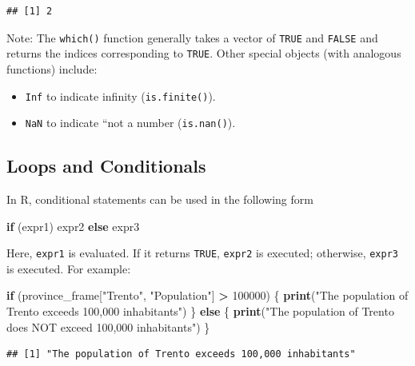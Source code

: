 \documentclass[
]{article}
\newenvironment{Shaded}{\begin{snugshade}}{\end{snugshade}}
\newcommand{\ControlFlowTok}[1]{\textcolor[rgb]{0.13,0.29,0.53}{\textbf{#1}}}
\newcommand{\DecValTok}[1]{\textcolor[rgb]{0.00,0.00,0.81}{#1}}
\newcommand{\FunctionTok}[1]{\textcolor[rgb]{0.13,0.29,0.53}{\textbf{#1}}}
\newcommand{\NormalTok}[1]{#1}
\newcommand{\SpecialCharTok}[1]{\textcolor[rgb]{0.81,0.36,0.00}{\textbf{#1}}}
\newcommand{\StringTok}[1]{\textcolor[rgb]{0.31,0.60,0.02}{#1}}
\providecommand{\tightlist}{%
  \setlength{\itemsep}{0pt}\setlength{\parskip}{0pt}}
\begin{document}
\begin{verbatim}
## [1] 2
\end{verbatim}

Note: The \texttt{which()} function generally takes a vector of
\texttt{TRUE} and \texttt{FALSE} and returns the indices corresponding
to \texttt{TRUE}. Other special objects (with analogous functions)
include:

\begin{itemize}
\tightlist
\item
  \texttt{Inf} to indicate infinity (\texttt{is.finite()}).
\item
  \texttt{NaN} to indicate ``not a number (\texttt{is.nan()}).
\end{itemize}

\hypertarget{loops-and-conditionals}{%
\subsection{Loops and Conditionals}\label{loops-and-conditionals}}

In R, conditional statements can be used in the following form

\begin{Shaded}
\begin{Highlighting}[]
\ControlFlowTok{if}\NormalTok{ (expr1) expr2 }\ControlFlowTok{else}\NormalTok{ expr3}
\end{Highlighting}
\end{Shaded}

Here, \texttt{expr1} is evaluated. If it returns \texttt{TRUE},
\texttt{expr2} is executed; otherwise, \texttt{expr3} is executed. For
example:

\begin{Shaded}
\begin{Highlighting}[]
\ControlFlowTok{if}\NormalTok{ (province\_frame[}\StringTok{"Trento"}\NormalTok{, }\StringTok{"Population"}\NormalTok{] }\SpecialCharTok{\textgreater{}} \DecValTok{100000}\NormalTok{) \{}
  \FunctionTok{print}\NormalTok{(}\StringTok{"The population of Trento exceeds 100,000 inhabitants"}\NormalTok{)}
\NormalTok{\} }\ControlFlowTok{else}\NormalTok{ \{}
  \FunctionTok{print}\NormalTok{(}\StringTok{"The population of Trento does NOT exceed 100,000 inhabitants"}\NormalTok{)}
\NormalTok{\}}
\end{Highlighting}
\end{Shaded}

\begin{verbatim}
## [1] "The population of Trento exceeds 100,000 inhabitants"
\end{verbatim}
\end{document}
